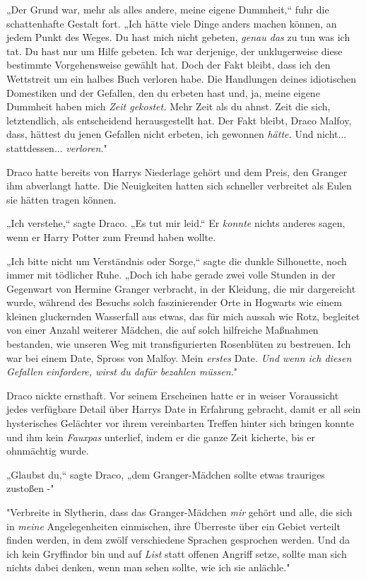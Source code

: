 {„Der Grund war, mehr als alles andere, meine eigene Dummheit,“ fuhr die schattenhafte Gestalt fort. „Ich hätte viele Dinge anders machen können, an jedem Punkt des Weges. Du hast mich nicht gebeten, \emph{genau das} zu tun was ich tat. Du hast nur um Hilfe gebeten. Ich war derjenige, der unklugerweise diese bestimmte Vorgehensweise gewählt hat. Doch der Fakt bleibt, dass ich den Wettstreit um ein halbes Buch verloren habe. Die Handlungen deines idiotischen Domestiken und der Gefallen, den du erbeten hast und, ja, meine eigene Dummheit haben mich \emph{Zeit gekostet.} Mehr Zeit als du ahnst. Zeit die sich, letztendlich, als entscheidend herausgestellt hat. Der Fakt bleibt, Draco Malfoy, dass, hättest du jenen Gefallen nicht erbeten, ich gewonnen \emph{hätte.} Und nicht... stattdessen... \emph{verloren.}"

Draco hatte bereits von Harrys Niederlage gehört und dem Preis, den Granger ihm abverlangt hatte. Die Neuigkeiten hatten sich schneller verbreitet als Eulen sie hätten tragen können.

„Ich verstehe,“ sagte Draco. „Es tut mir leid.“ Er \emph{konnte} nichts anderes sagen, wenn er Harry Potter zum Freund haben wollte.

„Ich bitte nicht um Verständnis oder Sorge,“ sagte die dunkle Silhouette, noch immer mit tödlicher Ruhe. „Doch ich habe gerade zwei volle Stunden in der Gegenwart von Hermine Granger verbracht, in der Kleidung, die mir dargereicht wurde, während des Besuchs solch faszinierender Orte in Hogwarts wie einem kleinen gluckernden Wasserfall aus etwas, das für mich aussah wie Rotz, begleitet von einer Anzahl weiterer Mädchen, die auf solch hilfreiche Maßnahmen bestanden, wie unseren Weg mit transfigurierten Rosenblüten zu bestreuen. Ich war bei einem Date, Spross von Malfoy. Mein \emph{erstes} Date. \emph{Und wenn ich diesen Gefallen einfordere, wirst du dafür bezahlen müssen.}"

Draco nickte ernsthaft. Vor seinem Erscheinen hatte er in weiser Voraussicht jedes verfügbare Detail über Harrys Date in Erfahrung gebracht, damit er all sein hysterisches Gelächter vor ihrem vereinbarten Treffen hinter sich bringen konnte und ihm kein \emph{Fauxpas} unterlief, indem er die ganze Zeit kicherte, bis er ohnmächtig wurde.

„Glaubst du,“ sagte Draco, „dem Granger-Mädchen sollte etwas trauriges zustoßen -"

"Verbreite in Slytherin, dass das Granger-Mädchen \emph{mir} gehört und alle, die sich in \emph{meine} Angelegenheiten einmischen, ihre Überreste über ein Gebiet verteilt finden werden, in dem zwölf verschiedene Sprachen gesprochen werden. Und da ich kein Gryffindor bin und auf \emph{List} statt offenen Angriff setze, sollte man sich nichts dabei denken, wenn man sehen sollte, wie ich sie anlächle."

}
